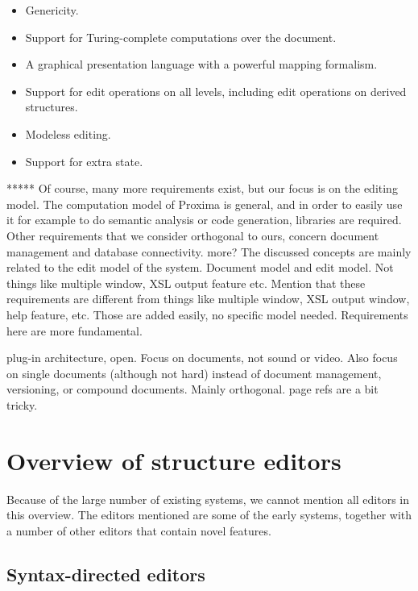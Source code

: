 \begin{itemize}
\item Genericity.
\item Support for Turing-complete computations over the document.
\item A graphical presentation language with a powerful mapping formalism.
\item Support for edit operations on all levels, including edit operations on derived structures.
\item Modeless editing.
\item Support for extra state.
\end{itemize}


*****
Of course, many more requirements exist, but our focus is on the editing model. The computation model of Proxima is general, and in order to easily use it for example to do semantic analysis or code generation, libraries are required. Other requirements that we consider orthogonal to ours, concern document management and database connectivity. 
\bc
more?
The discussed concepts are mainly related to the edit model of the system. 
Document model and edit model. Not things like multiple window, XSL output feature etc.
Mention that these requirements are different from things like multiple window, XSL output window, help feature, etc. Those are added easily, no specific model needed. Requirements here are more fundamental.

plug-in architecture, open.
Focus on documents, not sound or video. Also focus on single documents (although not hard) 
instead of document management, versioning, or compound documents. Mainly orthogonal.
page refs are a bit tricky.
\ec







%																
%																
%																
\section{Overview of structure editors}

Because of the large number of existing systems, we cannot mention all editors in this overview. The editors mentioned are some of the early systems, together with a number of other editors that contain novel features.


%																
\subsection{Syntax-directed editors} \label{sect:synDirEditors}

